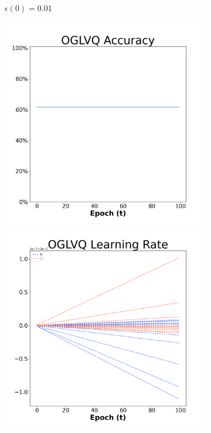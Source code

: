 \begin{figure}[H]
\begin{subfigure}{0.3\textwidth}
  \caption{$\epsilon(0)=0.01$}
\end{subfigure}\hfil %
\begin{subfigure}{0.3\textwidth}
  \includegraphics[width=\linewidth]{images/exper1/SP/OGLVQ_0.03_acc.png}
  \includegraphics[width=\linewidth]{images/exper1/SP/OGLVQ_0.03_lr.png}

\end{subfigure}
\end{figure}
